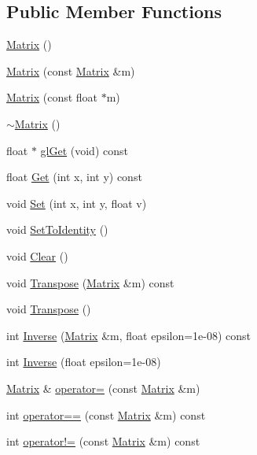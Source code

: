 \subsection*{Public Member Functions}
\begin{DoxyCompactItemize}
\item 
\hyperlink{classMatrix_a2dba13c45127354c9f75ef576f49269b}{Matrix} ()
\item 
\hyperlink{classMatrix_a765f4dcb51b6829311cc3e7576388423}{Matrix} (const \hyperlink{classMatrix}{Matrix} \&m)
\item 
\hyperlink{classMatrix_acfc1445f8a381d32f1989cd35714c290}{Matrix} (const float $\ast$m)
\item 
\hyperlink{classMatrix_a9b1c3627f573d78a2f08623fdfef990f}{$\sim$\+Matrix} ()
\item 
float $\ast$ \hyperlink{classMatrix_af8d06eec2ed4cc9329d664d539c7f2b8}{gl\+Get} (void) const 
\item 
float \hyperlink{classMatrix_aef91dcc82ede72fd100dc3e4004234c7}{Get} (int x, int y) const 
\item 
void \hyperlink{classMatrix_ac3560c1c5173148d2ed77488e46bd79f}{Set} (int x, int y, float v)
\item 
void \hyperlink{classMatrix_a16343771112fd6a54e6f3383bd82598d}{Set\+To\+Identity} ()
\item 
void \hyperlink{classMatrix_a77024c11b6ff4b02a265bfda0ff7eab1}{Clear} ()
\item 
void \hyperlink{classMatrix_a8191ef7491d6caa30bc367ec7c64cf30}{Transpose} (\hyperlink{classMatrix}{Matrix} \&m) const 
\item 
void \hyperlink{classMatrix_a350d12361c31ec650e667e8120da7274}{Transpose} ()
\item 
int \hyperlink{classMatrix_a84db3b710d89b69bf7fe5c019185fbbb}{Inverse} (\hyperlink{classMatrix}{Matrix} \&m, float epsilon=1e-\/08) const 
\item 
int \hyperlink{classMatrix_af203ab3d087288d9eb6e84afe5814fa9}{Inverse} (float epsilon=1e-\/08)
\item 
\hyperlink{classMatrix}{Matrix} \& \hyperlink{classMatrix_aea5a06385f646eb4a63929fae6fa3e14}{operator=} (const \hyperlink{classMatrix}{Matrix} \&m)
\item 
int \hyperlink{classMatrix_a3907074da7d66966da2ae99413d1c3bf}{operator==} (const \hyperlink{classMatrix}{Matrix} \&m) const 
\item 
int \hyperlink{classMatrix_a7677246e5e4d8350758f4f651dc87c90}{operator!=} (const \hyperlink{classMatrix}{Matrix} \&m) const 

\end{DoxyCompactItemize}
